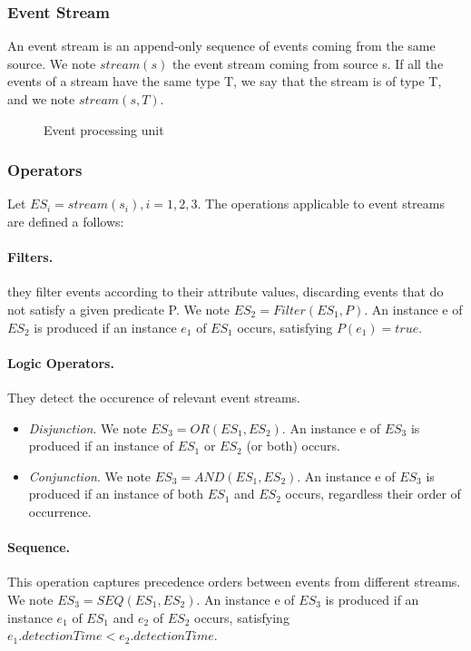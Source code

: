 \documentclass[a4paper,twoside]{article}
\begin{document}
\subsubsection{Event Stream}
An event stream is an append-only sequence of events coming from the same source. We note $stream(s)$ the event stream coming from source s. If all the events of a stream have the same type T, we say that the stream is of type T, and we note $stream(s,T)$. 

\begin{figure*}
  \centering
   {}
  \caption{Event processing unit}
  \label{fig:event processing unit}
 \end{figure*}

\subsubsection{Operators}
Let $ES_i = stream(s_i), i=1,2,3 $. 
The operations applicable to event streams are defined a follows:
\paragraph{Filters.} they filter events according to their attribute values, discarding events that do not satisfy a given predicate P. 
We note $ES_2 = Filter(ES_1, P)$. An instance e of $ES_2$ is produced if an instance $e_1$ of $ES_1$ occurs, satisfying $P(e_1) = true$.
\paragraph{Logic Operators.} They detect the occurence of relevant event streams.
\begin{itemize}
\item \textit{Disjunction}. We note $ES_3 = OR(ES_1, ES_2)$. An instance e of $ES_3$ is produced if an instance of $ES_1$ or $ES_2$ (or both) occurs.
\item \textit{Conjunction}. We note $ES_3 = AND(ES_1, ES_2)$. An instance e of $ES_3$ is produced if an instance of both $ES_1$ and $ES_2$ occurs, regardless their order of occurrence.
\end{itemize}
\paragraph{Sequence.} This operation captures precedence orders between events from different streams. We note $ES_3= SEQ(ES_1, ES_2)$. An instance e of $ES_3$ is produced if an instance $e_1$ of $ES_1$ and $e_2$ of $ES_2$ occurs, satisfying $e_{1}.detectionTime < e_{2}.detectionTime$. 
\end{document}
